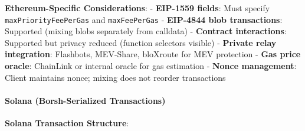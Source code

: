 \documentclass[
  11pt,
]{article}
\begin{document}
\textbf{Ethereum-Specific Considerations}: - \textbf{EIP-1559 fields}:
Must specify \texttt{maxPriorityFeePerGas} and \texttt{maxFeePerGas} -
\textbf{EIP-4844 blob transactions}: Supported (mixing blobs separately
from calldata) - \textbf{Contract interactions}: Supported but privacy
reduced (function selectors visible) - \textbf{Private relay
integration}: Flashbots, MEV-Share, bloXroute for MEV protection -
\textbf{Gas price oracle}: ChainLink or internal oracle for gas
estimation - \textbf{Nonce management}: Client maintains nonce; mixing
does not reorder transactions

\hypertarget{solana-borsh-serialized-transactions}{%
\paragraph{Solana (Borsh-Serialized
Transactions)}\label{solana-borsh-serialized-transactions}}

\textbf{Solana Transaction Structure}:
\end{document}
